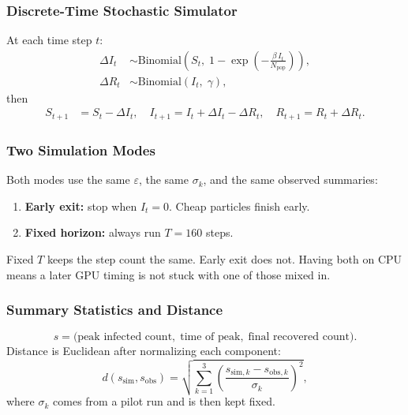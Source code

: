\documentclass[conference]{IEEEtran}
\begin{document}
\subsubsection{Discrete-Time Stochastic Simulator}

At each time step $t$:
\begin{align}
    \Delta I_t &\sim \mathrm{Binomial}\!\left(S_t,\;
                 1 - \exp\!\left(-\frac{\beta\, I_t}{N_{\mathrm{pop}}}\right)
                 \right), \label{eq:sir_infections} \\
    \Delta R_t &\sim \mathrm{Binomial}(I_t,\; \gamma),
                 \label{eq:sir_recoveries}
\end{align}
then
\begin{align}
    S_{t+1} &= S_t - \Delta I_t, \quad
    I_{t+1} = I_t + \Delta I_t - \Delta R_t, \quad
    R_{t+1} = R_t + \Delta R_t.
\end{align}

\subsubsection{Two Simulation Modes}

Both modes use the same $\varepsilon$, the same $\sigma_k$, and the same
observed summaries:
\begin{enumerate}
    \item \textbf{Early exit:} stop when $I_t = 0$. Cheap particles finish
          early.
    \item \textbf{Fixed horizon:} always run $T = 160$ steps.
\end{enumerate}
Fixed $T$ keeps the step count the same. Early exit does not. Having both
on CPU means a later GPU timing is not stuck with one of those mixed in.

\subsubsection{Summary Statistics and Distance}

\begin{equation}
    s = \bigl(\text{peak infected count},\;
         \text{time of peak},\;
         \text{final recovered count}\bigr).
\end{equation}
Distance is Euclidean after normalizing each component:
\begin{equation}
    d(s_{\mathrm{sim}}, s_{\mathrm{obs}}) =
    \sqrt{\sum_{k=1}^{3}
      \left(\frac{s_{\mathrm{sim},k} - s_{\mathrm{obs},k}}
                 {\sigma_k}\right)^{\!2}},
    \label{eq:sir_distance}
\end{equation}
where $\sigma_k$ comes from a pilot run and is then kept fixed.
\end{document}
